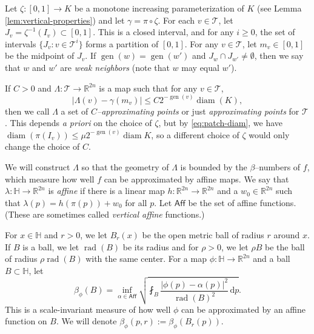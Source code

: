 \documentclass[12pt,reqno]{amsart}
\newcommand{\cT}{\mathcal{T}}
\DeclareMathOperator{\rad}{rad}
\newcommand{\Aff}{\mathsf{Aff}}
\DeclareMathOperator{\gen}{gen}
\newcommand{\HH}{\mathbb{H}}
\newcommand{\R}{\mathbb{R}}
\newcommand{\ud}[0]{\,\mathrm{d}}
\newcommand{\from}{\colon}
\theoremstyle{remark}
\newcommand{\0}{\mathbf{0}}
\renewcommand{\1}{\mathbf 1}
\DeclareMathOperator{\diam}{diam}
\begin{document}
Let $\zeta\from [0,1]\to K$ be a monotone increasing parameterization of $K$ (see Lemma \ref{lem:vertical-properties}) and let $\gamma= \pi\circ \zeta$. For each $v\in \cT$, let $J_v = \zeta^{-1}(I_v)\subset [0,1]$. This is a closed interval, and for any $i\ge 0$, the set of intervals $\{J_v:v\in \cT^i\}$ forms a partition of $[0,1]$. For any $v\in \cT$, let $m_v\in [0,1]$ be the midpoint of $J_v$. If $\gen(w) = \gen(w')$ and $J_w \cap J_{w'}\ne \emptyset$, then we say that $w$ and $w'$ are \emph{weak neighbors} (note that $w$ may equal $w'$).

If $C>0$ and $\Lambda \from \cT \to \R^{2n}$ is a map such that for any $v\in \cT$, 
\begin{equation}\label{eq:approx-points}
  |\Lambda(v) - \gamma(m_v)| \le C 2^{-\gen(v)} \diam(K),
\end{equation}
then we call $\Lambda$ a set of \emph{$C$--approximating points} or just \emph{approximating points} for $\cT$. This depends \emph{a priori} on the choice of $\zeta$, but by \eqref{eq:patch-diam}, we have $\diam(\pi(I_v))\le \mu 2^{-\gen(v)} \diam K$, so a different choice of $\zeta$ would only change the choice of $C$.

We will construct $\Lambda$ so that the geometry of $\Lambda$ is bounded by the $\beta$--numbers of $f$, which measure how well $f$ can be approximated by affine maps. We say that $\lambda\from \HH\to \R^{2n}$ is \emph{affine} if there is a linear map $h \from \R^{2n}\to \R^{2n}$ and a $w_0\in \R^{2n}$ such that $\lambda(p) =h(\pi(p)) + w_0$ for all $p$. Let $\Aff$ be the set of affine functions. (These are sometimes called \emph{vertical affine} functions.)

For $x\in \HH$ and $r>0$, we let $B_r(x)$ be the open metric ball of radius $r$ around $x$. If $B$ is a ball, we let $\rad(B)$ be its radius and for $\rho>0$, we let $\rho B$ be the ball of radius $\rho \rad(B)$ with the same center. For a map $\phi\from \HH \to \R^{2n}$ and a ball $B\subset \HH$, let
\begin{equation}\label{eqn:BetaPhiAlpha}
\beta_\phi(B) = \inf_{\alpha\in \Aff} \sqrt{\fint_{B} \frac{|\phi(p) - \alpha(p)|^2}{\rad(B)^2} \ud p}.
\end{equation}
This is a scale-invariant measure of how well $\phi$ can be approximated by an affine function on $B$. We will denote $\beta_\phi(p,r):=\beta_\phi(B_r(p))$.
\end{document}
